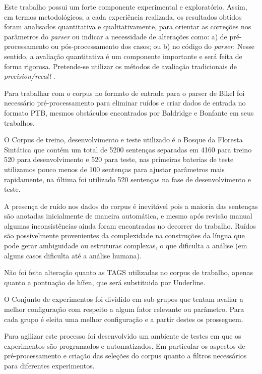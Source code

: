 Este trabalho possui um forte componente experimental e exploratório. Assim, em termos metodológicos, a cada experiência realizada, os resultados obtidos foram analisados quantitativa e qualitativamente, para orientar as correções nos parâmetros do \emph{parser} ou indicar a necessidade de alterações como: a) de pré-processamento ou pós-processamento dos casos; ou b) no código do \emph{parser}. Nesse sentido, a avaliação quantitativa é um componente importante e será feita de forma rigorosa. Pretende-se utilizar os métodos de avaliação tradicionais de \emph{precision/recall} \cite{black91}.

Para trabalhar com o corpus no formato de entrada para o parser de Bikel foi necessário pré-processamento para eliminar ruídos e criar dados de entrada no formato PTB, mesmos obstáculos encontrados por Baldridge \cite{baldridge06} e Bonfante\cite{bonfante03} em seus trabalhos. 

O Corpus de treino, desenvolvimento e teste utilizado é o Bosque da Floresta Sintática que contém um total de 5200 sentenças separadas em 4160 para treino 520 para desenvolvimento e 520 para teste, nas primeiras baterias de teste utilizamos pouco menos de 100 sentenças para ajustar parâmetros mais rapidamente, na última foi utilizado 520 sentenças na fase de desenvolvimento e teste.

A presença de ruído nos dados do corpus é inevitável pois a maioria das sentenças são anotadas inicialmente de maneira automática, e mesmo após revisão manual algumas inconsistências ainda foram encontradas no decorrer do trabalho. Ruídos são possívelmente provenientes da complexidade na construções da língua que pode gerar ambiguidade ou estruturas complexas, o que dificulta a análise (em alguns casos dificulta até a análise humana). 

Não foi feita alteração quanto as TAGS utilizadas no corpus de trabalho, apenas quanto a pontuação de hífen, que será substituida por Underline.

O Conjunto de experimentos foi dividido em sub-grupos que tentam avaliar a melhor configuração com respeito a algum fator relevante ou parâmetro. Para cada grupo é eleita uma melhor configuração e a partir destes os prosseguem.

Para agilizar este processo foi desenvolvido um ambiente de testes em que os experimentos são programados e automatizados. Em particular os aspectos de pré-processamento e criação das seleções do corpus quanto a filtros necessários para diferentes experimentos.



